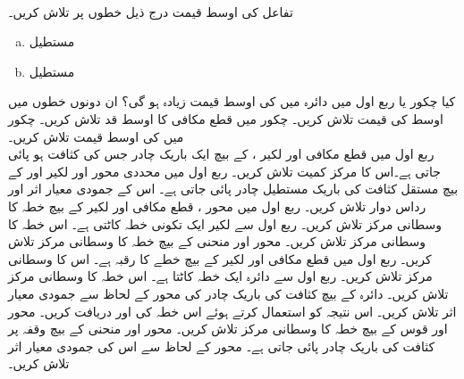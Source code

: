 \\
تفاعل  کی اوسط قیمت درج ذیل خطوں پر تلاش کریں۔
\begin{enumerate}[a.]
\item
مستطیل 
\item
مستطیل 
\end{enumerate}
کیا چکور  یا ربع اول میں دائرہ   میں   کی اوسط قیمت زیادہ ہو گی؟ ان دونوں خطوں میں اوسط کی قیمت تلاش کریں۔
چکور  میں قطع مکافی  کا  اوسط قد تلاش کریں۔
چکور  میں  کی اوسط قیمت تلاش کریں۔
\\
ربع اول میں قطع مکافی  اور لکیر ،  کے بیچ ایک باریک چادر جس کی کثافت  ہو  پائی جاتی ہے۔اس کا مرکز کمیت تلاش کریں۔
ربع اول میں محددی محور اور  لکیر  اور   کے بیچ  مستقل کثافت کی باریک  مستطیل چادر پائی جاتی ہے۔ اس کے جمودی  معیار اثر اور رداس دوار تلاش کریں۔
ربع اول میں محور ، قطع مکافی  اور لکیر  کے بیچ خطہ کا وسطانی مرکز تلاش کریں۔
ربع اول سے لکیر  ایک تکونی خطہ کاٹتی ہے۔ اس خطہ کا وسطانی مرکز تلاش کریں۔
محور  اور  منحنی  کے بیچ خطہ کا وسطانی مرکز تلاش کریں۔
ربع اول میں قطع مکافی   اور لکیر  کے بیچ خطے کا رقبہ  ہے۔ اس کا وسطانی مرکز تلاش کریں۔
ربع اول سے دائرہ   ایک خطہ کاٹتا ہے۔ اس خطہ کا وسطانی مرکز تلاش کریں۔
دائرہ  کے بیچ کثافت   کی باریک چادر کی محور  کے لحاظ سے جمودی معیار اثر تلاش کریں۔ اس نتیجہ کو استعمال کرتے ہوئے اس خطہ کی  اور  دریافت کریں۔
محور  اور قوس  کے بیچ خطہ کا وسطانی مرکز تلاش کریں۔
محور  اور  منحنی  کے بیچ وقفہ  پر کثافت  کی باریک چادر پائی جاتی ہے۔ محور  کے لحاظ سے اس کی جمودی معیار اثر تلاش کریں۔
